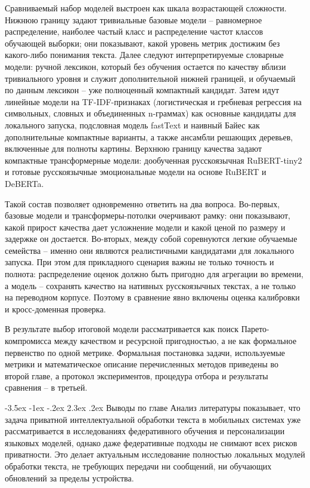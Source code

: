 \documentclass[12pt,a4paper]{report}
\makeatletter
\renewcommand{\section}{\@startsection{section}{1}{\z@}%
  {-3.5ex \@plus -1ex \@minus -.2ex}%
  {2.3ex \@plus .2ex}%
  {\normalfont\large\bfseries\centering}}
\makeatother
\begin{document}
Сравниваемый набор моделей выстроен как шкала возрастающей сложности. Нижнюю границу задают тривиальные базовые модели -- равномерное распределение, наиболее частый класс и распределение частот классов обучающей выборки; они показывают, какой уровень метрик достижим без какого-либо понимания текста. Далее следуют интерпретируемые словарные модели: ручной лексикон, который без обучения остается по качеству вблизи тривиального уровня и служит дополнительной нижней границей, и обучаемый по данным лексикон -- уже полноценный компактный кандидат. Затем идут линейные модели на TF-IDF-признаках (логистическая и гребневая регрессия на символьных, словных и объединенных n-граммах) как основные кандидаты для локального запуска, подсловная модель fastText и наивный Байес как дополнительные компактные варианты, а также ансамбли решающих деревьев, включенные для полноты картины. Верхнюю границу качества задают компактные трансформерные модели: дообученная русскоязычная RuBERT-tiny2 и готовые русскоязычные эмоциональные модели на основе RuBERT и DeBERTa.

Такой состав позволяет одновременно ответить на два вопроса. Во-первых, базовые модели и трансформеры-потолки очерчивают рамку: они показывают, какой прирост качества дает усложнение модели и какой ценой по размеру и задержке он достается. Во-вторых, между собой соревнуются легкие обучаемые семейства -- именно они являются реалистичными кандидатами для локального запуска. При этом для прикладного сценария важны не только точность и полнота: распределение оценок должно быть пригодно для агрегации во времени, а модель -- сохранять качество на нативных русскоязычных текстах, а не только на переводном корпусе. Поэтому в сравнение явно включены оценка калибровки и кросс-доменная проверка.

В результате выбор итоговой модели рассматривается как поиск Парето-компромисса между качеством и ресурсной пригодностью, а не как формальное первенство по одной метрике. Формальная постановка задачи, используемые метрики и математическое описание перечисленных методов приведены во второй главе, а протокол экспериментов, процедура отбора и результаты сравнения -- в третьей.

\section{Выводы по главе}
Анализ литературы показывает, что задача приватной интеллектуальной обработки текста в мобильных системах уже рассматривается в исследованиях федеративного обучения и персонализации языковых моделей, однако даже федеративные подходы не снимают всех рисков приватности. Это делает актуальным исследование полностью локальных модулей обработки текста, не требующих передачи ни сообщений, ни обучающих обновлений за пределы устройства.
\end{document}
